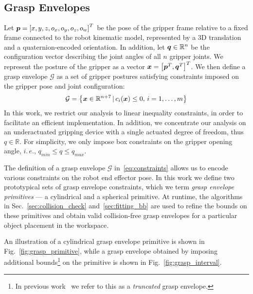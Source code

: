 \subsection{Grasp Envelopes}
Let $\mbox{\boldmath $p$} = \left[x,y,z,o_x,o_y,o_z,o_w\right]^T$ be the pose of the gripper frame relative to a fixed frame connected to the robot kinematic model, represented by a 3D translation and a quaternion-encoded orientation. 
In addition, let $\mbox{\boldmath $q$} \in \mathbb{R}^n$ be the configuration vector describing the joint angles of all $n$ gripper joints.
We represent the posture of the gripper as a vector $ \mbox{\boldmath $x$} = \left[\mbox{\boldmath $p$}^T, \mbox{\boldmath $q$}^T\right]^T$.
We then define a grasp envelope $\mathcal{G}$ as a set of gripper postures satisfying constraints imposed on the gripper pose and joint configuration:
\begin{equation}
\mathcal{G} = \left\{ \mbox{\boldmath $x$} \in \mathbb{R}^{n+7} \,|\, c_i(\mbox{\boldmath $x$}) \leq 0,\, i = 1, \ldots, m \right\}
\label{eq:constraints}
\end{equation}
%
In this work, we restrict our analysis to linear inequality constraints, in order to facilitate an efficient implementation.
In addition, we concentrate our analysis on an underactuated gripping device with a single actuated degree of freedom, thus $q \in \mathbb{R}$. 
For simplicity, we only impose box constraints on the gripper opening angle, $i. \, e.$, $q_{min} \leq q \leq q_{max}$.
\par
The definition of a grasp envelope $\mathcal{G}$ in~\eqref{eq:constraints} allows us to encode various constraints on the robot end effector pose.
In this work we define two prototypical sets of grasp envelope constraints, which we term \textit{grasp envelope primitives} --- a cylindrical and a spherical primitive.
At runtime, the algorithms in Sec.~\ref{sec:collision_check} and~\ref{sec:fitting_bb} are used to refine the bounds on these primitives and obtain valid collision-free grasp envelopes for a particular object placement in the workspace.

An illustration of a cylindrical grasp envelope primitive is shown in Fig.~\ref{fig:grasp_primitive}, while a grasp envelope obtained by imposing additional bounds\footnote{In previous work~\cite{Krug15} we refer to this as a \textit{truncated} grasp envelope.} on the primitive is shown in Fig.~\ref{fig:grasp_interval}. 

